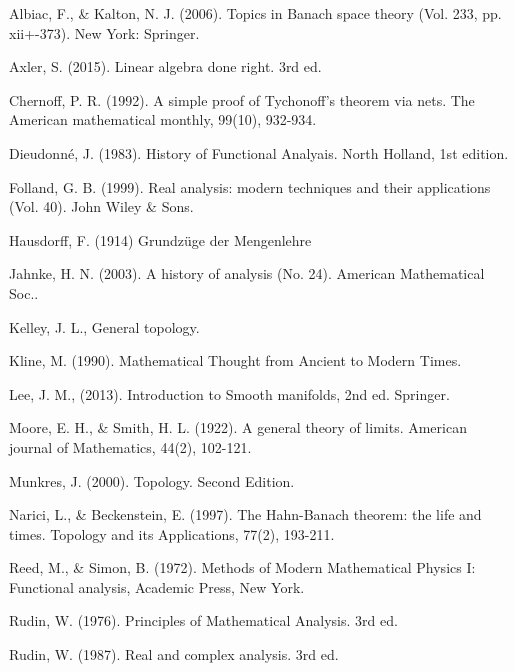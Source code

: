 \documentclass[12pt,b5paper,notitlepage]{article}
\theoremstyle{definition}
\theoremstyle{plain}
\numberwithin{equation}{section}
\begin{document}
\newpage

\printindex	






	\begin{thebibliography}{999999}
		\footnotesize	

Albiac, F., \& Kalton, N. J. (2006). Topics in Banach space theory (Vol. 233, pp. xii+-373). New York: Springer.

Axler, S. (2015). Linear algebra done right. 3rd ed.

Chernoff, P. R. (1992). A simple proof of Tychonoff's theorem via nets. The American mathematical monthly, 99(10), 932-934.


Dieudonné, J. (1983). History of Functional Analyais. North Holland, 1st edition.

Folland, G. B. (1999). Real analysis: modern techniques and their applications (Vol. 40). John Wiley \& Sons.


Hausdorff, F. (1914) Grundz\"uge der Mengenlehre

Jahnke, H. N. (2003). A history of analysis (No. 24). American Mathematical Soc..


Kelley, J. L., General topology. 

Kline, M. (1990). Mathematical Thought from Ancient to Modern Times.

Lee, J. M., (2013). Introduction to Smooth manifolds, 2nd ed. Springer.

Moore, E. H., \& Smith, H. L. (1922). A general theory of limits. American journal of Mathematics, 44(2), 102-121.

Munkres, J. (2000). Topology. Second Edition.

Narici, L., \& Beckenstein, E. (1997). The Hahn-Banach theorem: the life and times. Topology and its Applications, 77(2), 193-211.

Reed, M., \& Simon, B. (1972). Methods of Modern Mathematical Physics I: Functional analysis, Academic Press, New York.


Rudin, W. (1976). Principles of Mathematical Analysis. 3rd ed.

Rudin, W. (1987). Real and complex analysis. 3rd ed. 


\end{thebibliography}
\end{document}

